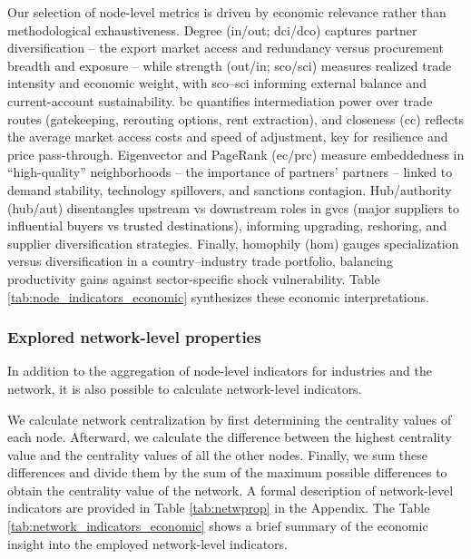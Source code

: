 \documentclass[preprint, 3p,
authoryear]{elsarticle} %
\begin{document}
Our selection of node-level metrics is driven by economic relevance
rather than methodological exhaustiveness. Degree (in/out;
\gls{dci}/\gls{dco}) captures partner diversification -- the export
market access and redundancy versus procurement breadth and exposure --
while strength (out/in; \gls{sco}/\gls{sci}) measures realized trade
intensity and economic weight, with \gls{sco}--\gls{sci} informing
external balance and current-account sustainability. \gls{bc} quantifies
intermediation power over trade routes (gatekeeping, rerouting options,
rent extraction), and closeness (\gls{cc}) reflects the average market
access costs and speed of adjustment, key for resilience and price
pass-through. Eigenvector and PageRank (\gls{ec}/\gls{prc}) measure
embeddedness in ``high-quality'' neighborhoods -- the importance of
partners' partners -- linked to demand stability, technology spillovers,
and sanctions contagion. Hub/authority (\gls{hub}/\gls{aut})
disentangles upstream vs downstream roles in \glspl{gvc} (major
suppliers to influential buyers vs trusted destinations), informing
upgrading, reshoring, and supplier diversification strategies. Finally,
homophily (\gls{hom}) gauges specialization versus diversification in a
country--industry trade portfolio, balancing productivity gains against
sector-specific shock vulnerability. Table
\ref{tab:node_indicators_economic} synthesizes these economic
interpretations.

\subsubsection{Explored network-level properties}\label{sec:methodnetwp}

In addition to the aggregation of node-level indicators for industries
and the network, it is also possible to calculate network-level
indicators.

We calculate network centralization by first determining the centrality
values of each node. Afterward, we calculate the difference between the
highest centrality value and the centrality values of all the other
nodes. Finally, we sum these differences and divide them by the sum of
the maximum possible differences to obtain the centrality value of the
network. A formal description of network-level indicators are provided
in Table \ref{tab:netwprop} in the Appendix. The Table
\ref{tab:network_indicators_economic} shows a brief summary of the
economic insight into the employed network-level indicators.
\end{document}
